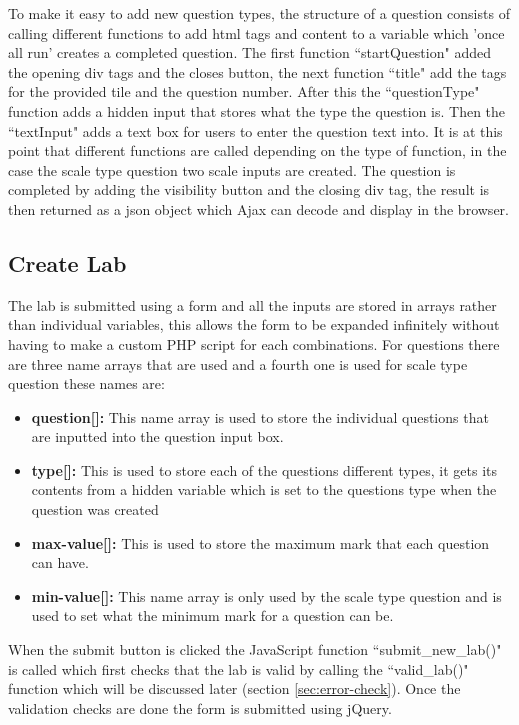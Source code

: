 \documentclass[11pt]{report}
\begin{document}
\noindent To make it easy to add  new question types, the structure of a question consists of calling different functions to add html tags and content to a variable which 'once all run' creates a completed question. The first function ``startQuestion" added the opening div tags and the closes button, the next function ``title" add the tags for the provided tile and the question number. After this the ``questionType" function adds a hidden input that stores what the type the question is. Then the ``textInput" adds a text box for users to enter the question text into. It is at this point that different functions are called depending on the type of function, in the case the scale type question two scale inputs are created. The question is completed by adding the visibility button and the closing div tag, the result is then returned as a json object which Ajax can decode and display in the browser. 





\subsection{Create Lab}

The lab is submitted using a form and all the inputs are  stored in arrays rather than individual variables, this allows the form to be expanded infinitely without having to make a custom PHP script for each combinations. For questions there are three name arrays that are used and a fourth one is used for scale type question these names are:

\begin{itemize}
    \item \textbf{question[]:} This name array is used to store the individual questions that are inputted into the question input box. 
    \item \textbf{type[]:} This is used to store each of the questions different types, it gets its contents from a hidden variable which is set to the questions type when the question was created
    \item \textbf{max-value[]:} This is used to store the maximum mark that each question can have.
    \item \textbf{min-value[]:} This name array is only used by the scale type question and is used to set what the minimum mark for a question can be.
\end{itemize}

When the submit button is clicked the JavaScript function ``submit\_new\_lab()" is called which first checks that the lab is valid by calling the ``valid\_lab()" function which will be discussed later (section \ref{sec:error-check}). Once the validation checks are done the form is submitted using jQuery. 
\end{document}
